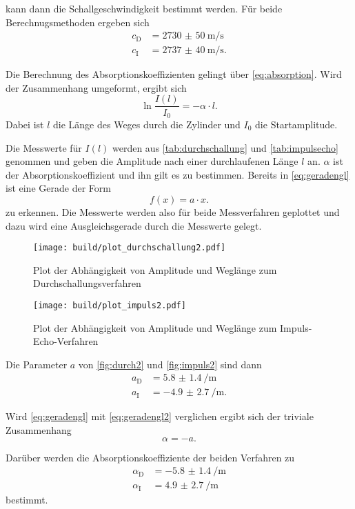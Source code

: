 kann dann die Schallgeschwindigkeit bestimmt werden.
Für beide Berechnugsmethoden ergeben sich
\begin{align}
    c_\text{D} &= \SI{2730(50)}{\meter\per\second}\\
    c_\text{I} &= \SI{2737(40)}{\meter\per\second}.
\end{align}

Die Berechnung des Absorptionskoeffizienten gelingt über \eqref{eq:absorption}. 
Wird der Zusammenhang umgeformt, ergibt sich 
\begin{equation}
    \ln{\frac{I(l)}{I_0}} = - \alpha \cdot l.
    \label{eq:geradengl}
\end{equation}
Dabei ist $l$ die Länge des Weges durch die Zylinder und $I_0$ die Startamplitude.

Die Messwerte für $I(l)$ werden aus \autoref{tab:durchschallung} und \autoref{tab:impulsecho} genommen und geben die Amplitude nach einer durchlaufenen Länge $l$ an.
$\alpha$ ist der Absorptionskoeffizient und ihn gilt es zu bestimmen. 
Bereits in \eqref{eq:geradengl} ist eine Gerade der Form 
\begin{equation}
    f(x) = a \cdot x.
    \label{eq:geradengl2}
\end{equation}
zu erkennen.
Die Messwerte werden also für beide Messverfahren geplottet und dazu wird eine Ausgleichsgerade durch die Messwerte gelegt.

\begin{figure}
    \centering
    \texttt{[image: build/plot\_durchschallung2.pdf]}
    \caption{Plot der Abhängigkeit von Amplitude und Weglänge zum Durchschallungsverfahren}
    \label{fig:durch2}
\end{figure}

\begin{figure}
    \centering
    \texttt{[image: build/plot\_impuls2.pdf]}
    \caption{Plot der Abhängigkeit von Amplitude und Weglänge zum Impuls-Echo-Verfahren}
    \label{fig:impuls2}
\end{figure}

Die Parameter $a$ von \autoref{fig:durch2} und \autoref{fig:impuls2} sind dann
\begin{align}
    a_\text{D} &= \SI{5.8(14)}{\per\meter}\\
    a_\text{I} &= \SI{-4.9(27)}{\per\meter}.
\end{align}

Wird \eqref{eq:geradengl} mit \eqref{eq:geradengl2} verglichen ergibt sich der triviale Zusammenhang 
\begin{equation}
    \alpha = - a.
\end{equation}

Darüber werden die Absorptionskoeffiziente der beiden Verfahren zu 
\begin{align}
    \alpha _\text{D} &= \SI{-5.8(14)}{\per\meter}\\
    \alpha _\text{I} &= \SI{4.9(27)}{\per\meter}
\end{align}
bestimmt.